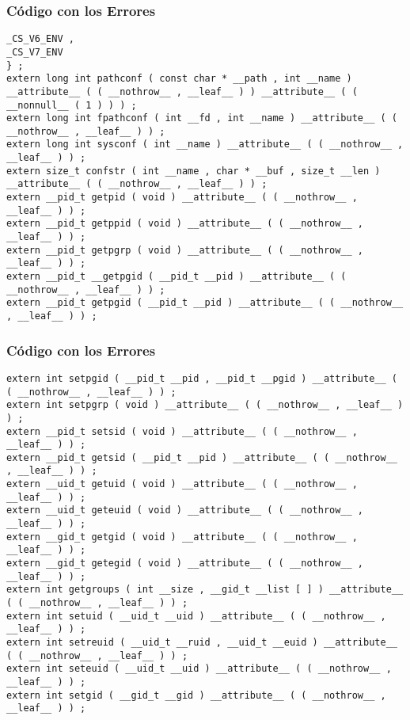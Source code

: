 \documentclass{beamer}
\begin{document}
\begin{frame}[fragile]
\frametitle{C\'odigo con los Errores}
\begin{lstlisting}[style=CStyle]
_CS_V6_ENV , 
_CS_V7_ENV 
} ; 
extern long int pathconf ( const char * __path , int __name ) 
__attribute__ ( ( __nothrow__ , __leaf__ ) ) __attribute__ ( ( __nonnull__ ( 1 ) ) ) ; 
extern long int fpathconf ( int __fd , int __name ) __attribute__ ( ( __nothrow__ , __leaf__ ) ) ; 
extern long int sysconf ( int __name ) __attribute__ ( ( __nothrow__ , __leaf__ ) ) ; 
extern size_t confstr ( int __name , char * __buf , size_t __len ) __attribute__ ( ( __nothrow__ , __leaf__ ) ) ; 
extern __pid_t getpid ( void ) __attribute__ ( ( __nothrow__ , __leaf__ ) ) ; 
extern __pid_t getppid ( void ) __attribute__ ( ( __nothrow__ , __leaf__ ) ) ; 
extern __pid_t getpgrp ( void ) __attribute__ ( ( __nothrow__ , __leaf__ ) ) ; 
extern __pid_t __getpgid ( __pid_t __pid ) __attribute__ ( ( __nothrow__ , __leaf__ ) ) ; 
extern __pid_t getpgid ( __pid_t __pid ) __attribute__ ( ( __nothrow__ , __leaf__ ) ) ; 
\end{lstlisting}
\end{frame}
\begin{frame}[fragile]
\frametitle{C\'odigo con los Errores}
\begin{lstlisting}[style=CStyle]
extern int setpgid ( __pid_t __pid , __pid_t __pgid ) __attribute__ ( ( __nothrow__ , __leaf__ ) ) ; 
extern int setpgrp ( void ) __attribute__ ( ( __nothrow__ , __leaf__ ) ) ; 
extern __pid_t setsid ( void ) __attribute__ ( ( __nothrow__ , __leaf__ ) ) ; 
extern __pid_t getsid ( __pid_t __pid ) __attribute__ ( ( __nothrow__ , __leaf__ ) ) ; 
extern __uid_t getuid ( void ) __attribute__ ( ( __nothrow__ , __leaf__ ) ) ; 
extern __uid_t geteuid ( void ) __attribute__ ( ( __nothrow__ , __leaf__ ) ) ; 
extern __gid_t getgid ( void ) __attribute__ ( ( __nothrow__ , __leaf__ ) ) ; 
extern __gid_t getegid ( void ) __attribute__ ( ( __nothrow__ , __leaf__ ) ) ; 
extern int getgroups ( int __size , __gid_t __list [ ] ) __attribute__ ( ( __nothrow__ , __leaf__ ) ) ; 
extern int setuid ( __uid_t __uid ) __attribute__ ( ( __nothrow__ , __leaf__ ) ) ; 
extern int setreuid ( __uid_t __ruid , __uid_t __euid ) __attribute__ ( ( __nothrow__ , __leaf__ ) ) ; 
extern int seteuid ( __uid_t __uid ) __attribute__ ( ( __nothrow__ , __leaf__ ) ) ; 
extern int setgid ( __gid_t __gid ) __attribute__ ( ( __nothrow__ , __leaf__ ) ) ; 
\end{lstlisting}
\end{frame}
\end{document}

